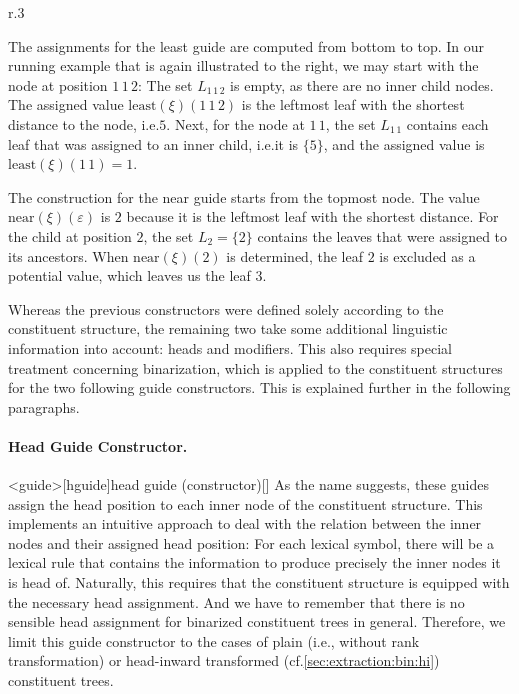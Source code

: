 \documentclass[../../document.tex]{subfiles}
\begin{document}
    \needspace{3cm}
    \begin{wrapfigure}[6]{r}{.3\linewidth}
        \centering
        
    \end{wrapfigure}
    The assignments for the least guide are computed from bottom to top.
    In our running example that is again illustrated to the right, we may start with the node at position \(1\,1\,2\): The set \(L_{1\,1\,2}\) is empty, as there are no inner child nodes. The assigned value \(\mathrm{least}(\xi)(1\,1\,2)\) is the leftmost leaf with the shortest distance to the node, i.e.\@ \(5\).
    Next, for the node at \(1\,1\), the set \(L_{1\,1}\) contains each leaf that was assigned to an inner child, i.e.\@ it is \(\{5\}\), and the assigned value is \(\mathrm{least}(\xi)(1\,1) = 1\).
    \exampleqed

    \begin{example}
        The construction for the near guide starts from the topmost node.
        The value \(\mathrm{near}(\xi)(\varepsilon)\) is \(2\) because it is the leftmost leaf with the shortest distance.
        For the child at position \(2\), the set \(L_{2} = \{2\}\) contains the leaves that were assigned to its ancestors.
        When \(\mathrm{near}(\xi)(2)\) is determined, the leaf \(2\) is excluded as a potential value, which leaves us the leaf \(3\).
    \end{example}

    Whereas the previous constructors were defined solely according to the constituent structure, the remaining two take some additional linguistic information into account: heads and modifiers.
    This also requires special treatment concerning binarization, which is applied to the constituent structures for the two following guide constructors.
    This is explained further in the following paragraphs.

    \paragraph{Head Guide Constructor.}<guide>[hguide]{head guide (constructor)}[] 
    As the name suggests, these guides assign the head position to each inner node of the constituent structure.
    This implements an intuitive approach to deal with the relation between the inner nodes and their assigned head position: For each lexical symbol, there will be a lexical rule that contains the information to produce precisely the inner nodes it is head of.
    Naturally, this requires that the constituent structure is equipped with the necessary head assignment.
    And we have to remember that there is no sensible head assignment for binarized constituent trees in general.
    Therefore, we limit this guide constructor to the cases of plain (i.e., without rank transformation) or head-inward transformed (cf.\@ \cref{sec:extraction:bin:hi}) constituent trees.
\end{document}
